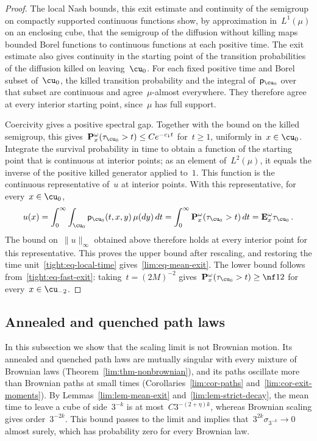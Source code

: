 \documentclass[11pt]{amsart}
\begin{document}
\begin{proof}
\smallskip

The local Nash bounds, this exit estimate and continuity of the semigroup on compactly supported continuous functions show, by approximation in~$L^1(\mu)$ on an enclosing cube, that the semigroup of the diffusion without killing maps bounded Borel functions to continuous functions at each positive time. The exit estimate also gives continuity in the starting point of the transition probabilities of the diffusion killed on leaving~$\cu_0$. For each fixed positive time and Borel subset of~$\cu_0$, the killed transition probability and the integral of~$\mathsf p_{\cu_0}$ over that subset are continuous and agree~$\mu$-almost everywhere. They therefore agree at every interior starting point, since~$\mu$ has full support.

\smallskip

Coercivity gives a positive spectral gap. Together with the bound on the killed semigroup, this gives~$\mathbf P_x^\omega(\tau_{\cu_0}>t)\leq Ce^{-c_1t}$ for~$t\geq1$, uniformly in~$x\in\cu_0$. Integrate the survival probability in time to obtain a function of the starting point that is continuous at interior points; as an element of~$L^2(\mu)$, it equals the inverse of the positive killed generator applied to~$1$. This function is the continuous representative of~$u$ at interior points. With this representative, for every~$x\in\cu_0$,
\begin{equation*}
	u(x)=\int_0^\infty\int_{\cu_0}\mathsf p_{\cu_0}(t,x,y)\,\mu(dy)\,dt
	=\int_0^\infty \mathbf P_x^\omega(\tau_{\cu_0}>t)\,dt
	=\mathbf E_x^\omega\tau_{\cu_0}\,.
\end{equation*}
The bound on~$\|u\|_\infty$ obtained above therefore holds at every interior point for this representative. This proves the upper bound after rescaling, and restoring the time unit~\eqref{tight:eq-local-time} gives~\eqref{lim:eq-mean-exit}. The lower bound follows from~\eqref{tight:eq-fast-exit}: taking~$t=(2M)^{-2}$ gives~$\mathbf P_x^\omega(\tau_{\cu_0}>t)\geq\nf12$ for every~$x\in\cu_{-2}$.
\end{proof}

\subsection{Annealed and quenched path laws}
\label{lim:sec-path-laws}

In this subsection we show that the scaling limit is not Brownian motion. Its annealed and quenched path laws are mutually singular with every mixture of Brownian laws (Theorem~\ref{lim:thm-nonbrownian}), and its paths oscillate more than Brownian paths at small times (Corollaries~\ref{lim:cor-paths} and~\ref{lim:cor-exit-moments}). By Lemmas~\ref{lim:lem-mean-exit} and~\ref{lim:lem-strict-decay}, the mean time to leave a cube of side~$3^{-k}$ is at most~$C3^{-(2+\eta)k}$, whereas Brownian scaling gives order~$3^{-2k}$. This bound passes to the limit and implies that~$3^{2k}\sigma_{3^{-k}}\to0$ almost surely, which has probability zero for every Brownian law.
\end{document}
